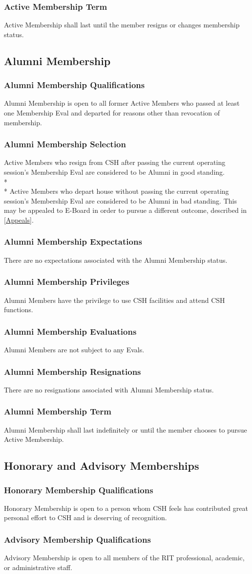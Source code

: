 \documentclass{article}
\newcommand{\asection}[1]{\subsection{#1} \label{#1}}
\newcommand{\asubsection}[1]{\subsubsection{#1} \label{#1}}
\begin{document}
\asubsection{Active Membership Term}
Active Membership shall last until the member resigns or changes membership status.

\asection{Alumni Membership}

\asubsection{Alumni Membership Qualifications}
Alumni Membership is open to all former Active Members who passed at least one Membership Eval and departed for reasons other than revocation of membership.

\asubsection{Alumni Membership Selection}
Active Members who resign from CSH after passing the current operating session's Membership Eval are considered to be Alumni in good standing.
\\*\\*
Active Members who depart house without passing the current operating session's Membership Eval are considered to be Alumni in bad standing.
This may be appealed to E-Board in order to pursue a different outcome, described in \ref{Appeals}.

\asubsection{Alumni Membership Expectations}
There are no expectations associated with the Alumni Membership status.

\asubsection{Alumni Membership Privileges}
Alumni Members have the privilege to use CSH facilities and attend CSH functions.

\asubsection{Alumni Membership Evaluations}
Alumni Members are not subject to any Evals.

\asubsection{Alumni Membership Resignations}
There are no resignations associated with Alumni Membership status.

\asubsection{Alumni Membership Term}
Alumni Membership shall last indefinitely or until the member chooses to pursue Active Membership.

\asection{Honorary and Advisory Memberships}

\asubsection{Honorary Membership Qualifications}
Honorary Membership is open to a person whom CSH feels has contributed great personal effort to CSH and is deserving of recognition.

\asubsection{Advisory Membership Qualifications}
Advisory Membership is open to all members of the RIT professional, academic, or administrative staff.
\end{document}
